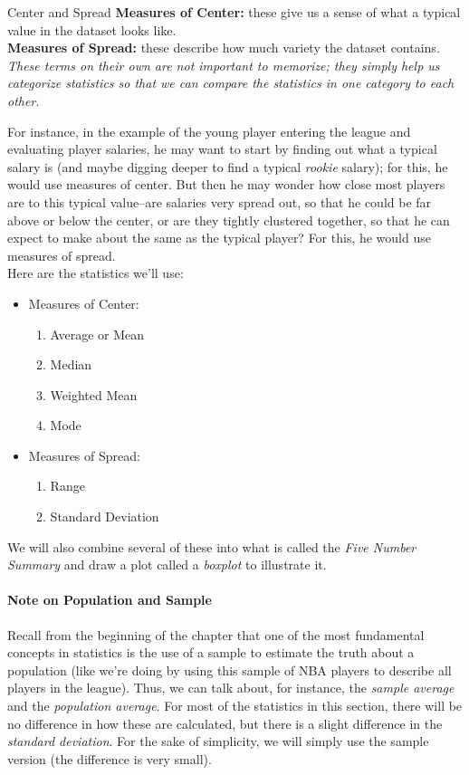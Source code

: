 \begin{proc}{Center and Spread}
\textbf{Measures of Center:} these give us a sense of what a typical value in the dataset looks like.\\

\textbf{Measures of Spread:} these describe how much variety the dataset contains.\\

\textit{These terms on their own are not important to memorize; they simply help us categorize statistics so that we can compare the statistics in one category to each other.}
\end{proc}

For instance, in the example of the young player entering the league and evaluating player salaries, he may want to start by finding out what a typical salary is (and maybe digging deeper to find a typical \emph{rookie} salary); for this, he would use measures of center.  But then he may wonder how close most players are to this typical value--are salaries very spread out, so that he could be far above or below the center, or are they tightly clustered together, so that he can expect to make about the same as the typical player?  For this, he would use measures of spread.\\

Here are the statistics we'll use:
\begin{itemize}
\item Measures of Center:
\begin{enumerate}
\item Average or Mean
\item Median
\item Weighted Mean
\item Mode
\end{enumerate}
\item Measures of Spread:
\begin{enumerate}
\item Range
\item Standard Deviation
\end{enumerate}
\end{itemize}
We will also combine several of these into what is called the \emph{Five Number Summary} and draw a plot called a \emph{boxplot} to illustrate it.

\paragraph{Note on Population and Sample} Recall from the beginning of the chapter that one of the most fundamental concepts in statistics is the use of a sample to estimate the truth about a population (like we're doing by using this sample of NBA players to describe all players in the league).  Thus, we can talk about, for instance, the \emph{sample average} and the \emph{population average}.  For most of the statistics in this section, there will be no difference in how these are calculated, but there is a slight difference in the \emph{standard deviation}.  For the sake of simplicity, we will simply use the sample version (the difference is very small).

